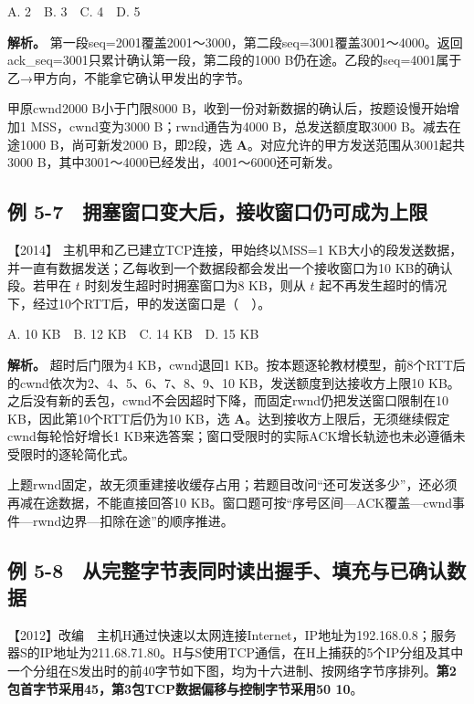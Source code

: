 A. 2　B. 3　C. 4　D. 5


\textbf{解析。} 第一段seq=2001覆盖2001～3000，第二段seq=3001覆盖3001～4000。返回ack\_seq=3001只累计确认第一段，第二段的1000 B仍在途。乙段的seq=4001属于乙→甲方向，不能拿它确认甲发出的字节。

甲原cwnd2000 B小于门限8000 B，收到一份对新数据的确认后，按题设慢开始增加1 MSS，cwnd变为3000 B；rwnd通告为4000 B，总发送额度取3000 B。减去在途1000 B，尚可新发2000 B，即2段，选 \textbf{A}。对应允许的甲方发送范围从3001起共3000 B，其中3001～4000已经发出，4001～6000还可新发。

\subsection{例 5-7　拥塞窗口变大后，接收窗口仍可成为上限}\label{cn-ex5-7}

\noindent{}【2014】 主机甲和乙已建立TCP连接，甲始终以MSS=1 KB大小的段发送数据，并一直有数据发送；乙每收到一个数据段都会发出一个接收窗口为10 KB的确认段。若甲在 \(t\) 时刻发生超时时拥塞窗口为8 KB，则从 \(t\) 起不再发生超时的情况下，经过10个RTT后，甲的发送窗口是（　）。

A. 10 KB　B. 12 KB　C. 14 KB　D. 15 KB


\textbf{解析。} 超时后门限为4 KB，cwnd退回1 KB。按本题逐轮教材模型，前8个RTT后的cwnd依次为2、4、5、6、7、8、9、10 KB，发送额度到达接收方上限10 KB。之后没有新的丢包，cwnd不会因超时下降，而固定rwnd仍把发送窗口限制在10 KB，因此第10个RTT后仍为10 KB，选 \textbf{A}。达到接收方上限后，无须继续假定cwnd每轮恰好增长1 KB来选答案；窗口受限时的实际ACK增长轨迹也未必遵循未受限时的逐轮简化式。

上题rwnd固定，故无须重建接收缓存占用；若题目改问``还可发送多少''，还必须再减在途数据，不能直接回答10 KB。窗口题可按``序号区间---ACK覆盖---cwnd事件---rwnd边界---扣除在途''的顺序推进。

\subsection{例 5-8　从完整字节表同时读出握手、填充与已确认数据}\label{cn-ex5-8}

\noindent{}【2012】改编　主机H通过快速以太网连接Internet，IP地址为192.168.0.8；服务器S的IP地址为211.68.71.80。H与S使用TCP通信，在H上捕获的5个IP分组及其中一个分组在S发出时的前40字节如下图，均为十六进制、按网络字节序排列。\textbf{第2包首字节采用45，第3包TCP数据偏移与控制字节采用50 10}。

